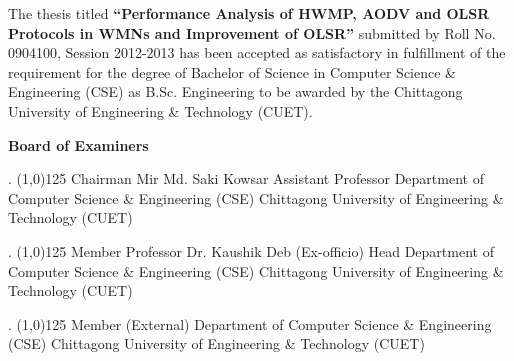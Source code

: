 \justify
The thesis titled \textbf{“Performance Analysis of HWMP,  AODV and OLSR Protocols in WMNs and Improvement of OLSR”} submitted by Roll No. 0904100, Session 2012-2013 has been accepted as satisfactory in fulfillment of the requirement for the degree of Bachelor of Science in Computer Science \& Engineering (CSE) as B.Sc. Engineering to be awarded by the Chittagong University of Engineering \& Technology (CUET).

\vspace{20mm}
\begin{center}
{\Large \textbf{Board of Examiners}}
\end{center}

\vspace{10mm} 
. \line(1,0){125} \hfill Chairman  \newline
Mir Md. Saki Kowsar \newline
Assistant Professor \newline
Department of Computer Science \& Engineering (CSE) \newline
Chittagong University of Engineering \& Technology (CUET) \newline


\vspace{10mm} 
. \line(1,0){125} \hfill Member  \newline
Professor Dr. Kaushik Deb \hfill (Ex-officio) \newline
Head \newline
Department of Computer Science \& Engineering (CSE) \newline
Chittagong University of Engineering \& Technology (CUET) \newline

\vspace{10mm} 
. \line(1,0){125} \hfill Member  \newline
(External) \newline
\newline
Department of Computer Science \& Engineering (CSE) \newline
Chittagong University of Engineering \& Technology (CUET) \newline




